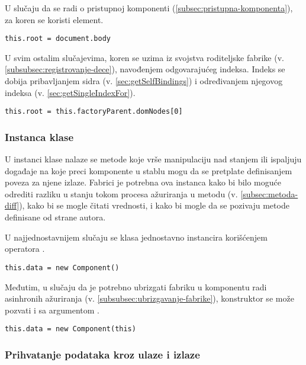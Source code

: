 U slučaju da se radi o pristupnoj komponenti (\cref{subsec:pristupna-komponenta}), za koren se koristi  element.

\begin{lstlisting}
this.root = document.body
\end{lstlisting}

U svim ostalim slučajevima, koren se uzima iz svojstva  roditeljske fabrike (v. \cref{subsubsec:registrovanje-dece}), navođenjem odgovarajućeg indeksa.
Indeks se dobija pribavljanjem sidra (v. \cref{sec:getSelfBindings}) i određivanjem njegovog indeksa (v. \cref{sec:getSingleIndexFor}).

\begin{lstlisting}
this.root = this.factoryParent.domNodes[0]
\end{lstlisting}

\subsubsection{Instanca klase}
\label{subsubsec:instanca-klase}
\label{subsubsec:init-part-2}

U instanci klase nalaze se metode koje vrše manipulaciju nad stanjem ili ispaljuju događaje na koje preci komponente u stablu mogu da se pretplate definisanjem poveza za njene izlaze.
Fabrici je potrebna ova instanca kako bi bilo moguće odrediti razliku u stanju tokom procesa ažuriranja u metodu  (v. \cref{subsec:metoda-diff}), kako bi se mogle čitati vrednosti, i kako bi mogle da se pozivaju metode definisane od strane autora.

U najjednostavnijem slučaju se klasa jednostavno instancira korišćenjem operatora .

\begin{lstlisting}
this.data = new Component()
\end{lstlisting}

Međutim, u slučaju da je potrebno ubrizgati fabriku u komponentu radi asinhronih ažuriranja (v. \cref{subsubsec:ubrizgavanje-fabrike}), konstruktor se može pozvati i sa argumentom .

\begin{lstlisting}
this.data = new Component(this)
\end{lstlisting}

\subsubsection{Prihvatanje podataka kroz ulaze i izlaze}
\label{subsubsec:init-part-3}

